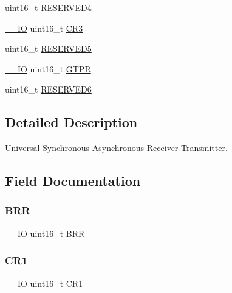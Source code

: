 \begin{DoxyCompactItemize}
\item 
uint16\+\_\+t \mbox{\hyperlink{struct_u_s_a_r_t___type_def_aa0223808025f5bf9c056185038c9d545}{R\+E\+S\+E\+R\+V\+E\+D4}}
\item 
\mbox{\hyperlink{core__sc300_8h_aec43007d9998a0a0e01faede4133d6be}{\+\_\+\+\_\+\+IO}} uint16\+\_\+t \mbox{\hyperlink{struct_u_s_a_r_t___type_def_a9651ce2df8eec57b9cab2f27f6dbf3e1}{C\+R3}}
\item 
uint16\+\_\+t \mbox{\hyperlink{struct_u_s_a_r_t___type_def_abd36010ac282682d1f3c641b183b1b6f}{R\+E\+S\+E\+R\+V\+E\+D5}}
\item 
\mbox{\hyperlink{core__sc300_8h_aec43007d9998a0a0e01faede4133d6be}{\+\_\+\+\_\+\+IO}} uint16\+\_\+t \mbox{\hyperlink{struct_u_s_a_r_t___type_def_a26f8b74978e03c8a4c99c9395a6a524d}{G\+T\+PR}}
\item 
uint16\+\_\+t \mbox{\hyperlink{struct_u_s_a_r_t___type_def_aab502dde158ab7da8e7823d1f8a06edb}{R\+E\+S\+E\+R\+V\+E\+D6}}
\end{DoxyCompactItemize}


\subsection{Detailed Description}
Universal Synchronous Asynchronous Receiver Transmitter. 

\subsection{Field Documentation}
\mbox{\label{struct_u_s_a_r_t___type_def_af0ba3d82d524fddbe0fb3309788e2954}} 
\subsubsection{\texorpdfstring{BRR}{BRR}}
{\footnotesize\ttfamily \mbox{\hyperlink{core__sc300_8h_aec43007d9998a0a0e01faede4133d6be}{\+\_\+\+\_\+\+IO}} uint16\+\_\+t B\+RR}

\mbox{\label{struct_u_s_a_r_t___type_def_a61400ce239355b62aa25c95fcc18a5e1}} 
\subsubsection{\texorpdfstring{CR1}{CR1}}
{\footnotesize\ttfamily \mbox{\hyperlink{core__sc300_8h_aec43007d9998a0a0e01faede4133d6be}{\+\_\+\+\_\+\+IO}} uint16\+\_\+t C\+R1}

